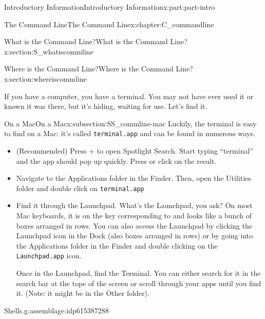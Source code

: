\documentclass[oneside,10pt,]{book}
\newcommand{\mono}[1]{\texttt{#1}}
\newcommand{\kbd}[1]{\keys{{#1}}}
\begin{document}
\begin{partptx}{Introductory Information}{}{Introductory Information}{}{}{x:part:part-intro}
\begin{chapterptx}{The Command Line}{}{The Command Line}{}{}{x:chapter:C_commandline}
\begin{sectionptx}{What is the Command Line?}{}{What is the Command Line?}{}{}{x:section:S_whatiscommline}
\end{sectionptx}
%
%
\typeout{************************************************}
\typeout{************************************************}
%
\begin{sectionptx}{Where is the Command Line?}{}{Where is the Command Line?}{}{}{x:section:whereiscommline}
%
%
\begin{introduction}{}%
If you have a computer, you have a terminal. You may not have ever used it or known it was there, but it's hiding, waiting for use. Let's find it.%
\end{introduction}%
%
%
\typeout{************************************************}
\typeout{************************************************}
%
\begin{subsectionptx}{On a Mac}{}{On a Mac}{}{}{x:subsection:SS_commline-mac}
%
Luckily, the terminal is easy to find on a Mac: it's called \mono{terminal.app} and can be found in numerous ways.%
\begin{itemize}[label=\textbullet]
\item{}(Recommended) Press \kbd{Command} + \kbd{Space} to open Spotlight Search. Start typing ``terminal'' and the app should pop up quickly. Press \kbd{Enter} or click on the result.%
\item{}Navigate to the Applications folder in the Finder. Then, open the Utilities folder and double click on \mono{terminal.app}%
\item{}Find it through the Launchpad. What's the Launchpad, you ask? On most Mac keyboards, it is on the key corresponding to \kbd{F4} and looks like a bunch of boxes arranged in rows. You can also access the Launchpad by clicking the Launchpad icon in the Dock (also boxes arranged in rows) or by going into the Applications folder in the Finder and double clicking on the \mono{Launchpad.app} icon.%
\par
Once in the Launchpad, find the Terminal. You can either search for it in the search bar at the tope of the screen or scroll through your apps until you find it. (Note: it might be in the Other folder).%
\end{itemize}
%
\begin{assemblage}{Shells.}{g:assemblage:idp615387288}%

\end{assemblage}
\end{subsectionptx}
\end{sectionptx}
\end{chapterptx}
\end{partptx}
\end{document}
